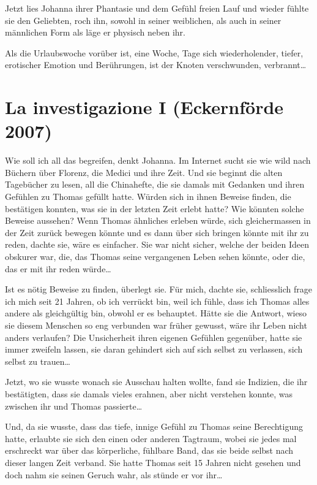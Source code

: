 \documentclass[10pt,titlepage,a5paper]{book}
\begin{document}
Jetzt lies Johanna ihrer Phantasie und dem Gefühl freien Lauf und wieder fühlte sie den Geliebten, roch ihn, sowohl in seiner weiblichen, als auch in seiner männlichen Form als läge er physisch neben ihr.

Als die Urlaubswoche vorüber ist, eine Woche, Tage sich wiederholender, tiefer, erotischer Emotion und Berührungen, ist der Knoten verschwunden, verbrannt\dots 



\section*{La investigazione I (Eckernförde 2007)}


Wie soll ich all das begreifen, denkt Johanna.
Im Internet sucht sie wie wild nach Büchern über Florenz, die Medici und ihre Zeit. Und sie beginnt die alten Tagebücher zu lesen, all die Chinahefte, die sie damals mit Gedanken und ihren Gefühlen zu Thomas gefüllt hatte. Würden sich in ihnen Beweise finden, die bestätigen konnten, was sie in der letzten Zeit erlebt hatte? Wie könnten solche Beweise aussehen? Wenn Thomas ähnliches erleben würde, sich gleichermassen in der Zeit zurück bewegen könnte und es dann über sich bringen könnte mit ihr zu reden, dachte sie, wäre es einfacher. Sie war nicht sicher, welche der beiden Ideen obskurer war, die, das Thomas seine vergangenen Leben sehen könnte, oder die, das er mit ihr reden würde\dots 

Ist es nötig Beweise zu finden, überlegt sie. Für mich, dachte sie, schliesslich frage ich mich seit 21 Jahren, ob ich verrückt bin, weil ich fühle, dass ich Thomas alles andere als gleichgültig bin, obwohl er es behauptet. Hätte sie die Antwort, wieso sie diesem Menschen so eng verbunden war früher gewusst, wäre ihr Leben nicht anders verlaufen? Die Unsicherheit ihren eigenen Gefühlen gegenüber, hatte sie immer zweifeln lassen, sie daran gehindert sich auf sich selbst zu verlassen, sich selbst zu trauen\dots 

Jetzt, wo sie wusste wonach sie Ausschau halten wollte, fand sie Indizien, die ihr bestätigten, dass sie damals vieles erahnen, aber nicht verstehen konnte, was zwischen ihr und Thomas passierte\dots 

Und, da sie wusste, dass das tiefe, innige Gefühl zu Thomas seine Berechtigung hatte, erlaubte sie sich den einen oder anderen Tagtraum, wobei sie jedes mal erschreckt war über das körperliche, fühlbare Band, das sie beide selbst nach dieser langen Zeit verband. Sie hatte Thomas seit 15 Jahren nicht gesehen und doch nahm sie seinen Geruch wahr, als stünde er vor ihr\dots 
\end{document}
